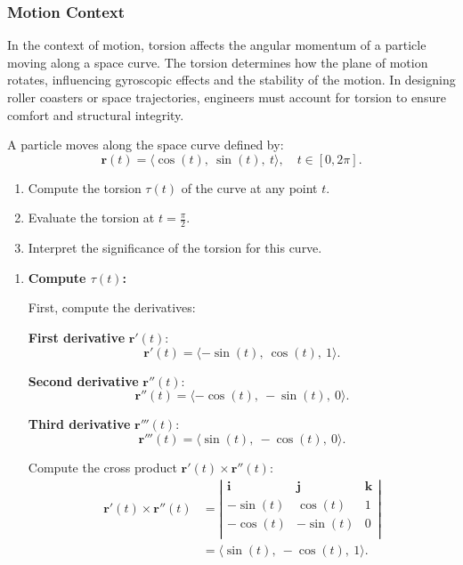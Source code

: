 \subsubsection*{Motion Context}

In the context of motion, torsion affects the angular momentum of a particle moving along a space curve. The torsion determines how the plane of motion rotates, influencing gyroscopic effects and the stability of the motion. In designing roller coasters or space trajectories, engineers must account for torsion to ensure comfort and structural integrity.

\vspace{1.3em}

\exampleline
\begin{example}
A particle moves along the space curve defined by:
\[
\mathbf{r}(t) = \langle \cos(t),\ \sin(t),\ t \rangle, \quad t \in [0, 2\pi].
\]
\begin{enumerate}
    \item Compute the torsion \( \tau(t) \) of the curve at any point \( t \).
    \item Evaluate the torsion at \( t = \frac{\pi}{2} \).
    \item Interpret the significance of the torsion for this curve.
\end{enumerate}

\begin{solution}
\begin{enumerate}
    \item \textbf{Compute \( \tau(t) \):}

    First, compute the derivatives:

    \textbf{First derivative} \( \mathbf{r}'(t) \):
    \[
    \mathbf{r}'(t) = \langle -\sin(t),\ \cos(t),\ 1 \rangle.
    \]

    \textbf{Second derivative} \( \mathbf{r}''(t) \):
    \[
    \mathbf{r}''(t) = \langle -\cos(t),\ -\sin(t),\ 0 \rangle.
    \]

    \textbf{Third derivative} \( \mathbf{r}'''(t) \):
    \[
    \mathbf{r}'''(t) = \langle \sin(t),\ -\cos(t),\ 0 \rangle.
    \]

    Compute the cross product \( \mathbf{r}'(t) \times \mathbf{r}''(t) \):
    \[
    \begin{aligned}
    \mathbf{r}'(t) \times \mathbf{r}''(t) &= \left| \begin{array}{ccc}
    \mathbf{i} & \mathbf{j} & \mathbf{k} \\
    -\sin(t) & \cos(t) & 1 \\
    -\cos(t) & -\sin(t) & 0 \\
    \end{array} \right| \\
    &= \langle \sin(t),\ -\cos(t),\ 1 \rangle.
    \end{aligned}
    \]


\end{enumerate}
\end{solution}
\end{example}

